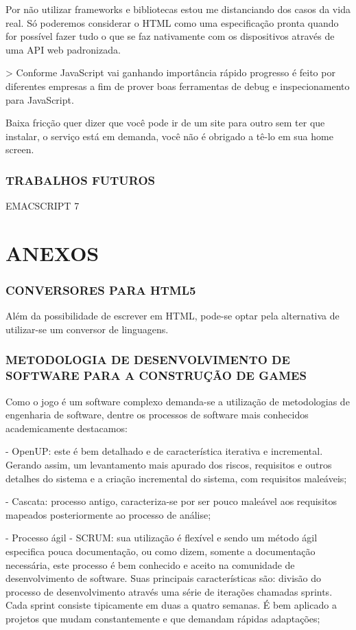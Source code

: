 \documentclass[11pt,a4paper]{article}
\begin{document}
Por não utilizar frameworks e bibliotecas estou me distanciando
dos casos da vida real. Só poderemos considerar o HTML como uma
especificação pronta quando
for possível fazer tudo o que se faz nativamente com os dispositivos
através de uma API web padronizada.

> Conforme JavaScript vai ganhando importância rápido progresso é
feito por diferentes empresas a fim de prover boas ferramentas de debug
e inspecionamento para JavaScript.

Baixa fricção quer dizer que você pode ir de um site para outro sem
ter que instalar, o serviço está em demanda, você não é obrigado a
tê-lo em sua home screen.


\subsection{ TRABALHOS FUTUROS}

EMACSCRIPT 7


\chapter{ANEXOS}

\subsection{ CONVERSORES PARA HTML5}
Além da possibilidade de escrever em HTML, pode-se optar pela
alternativa de utilizar-se um conversor de linguagens.

\subsection{ METODOLOGIA DE DESENVOLVIMENTO DE SOFTWARE PARA A CONSTRUÇÃO DE GAMES}

Como o jogo é um software complexo demanda-se a utilização de
metodologias de engenharia de software, dentre os processos de software
mais conhecidos academicamente destacamos:

- OpenUP: este é bem detalhado e de característica iterativa e
incremental. Gerando assim, um levantamento mais apurado dos riscos,
requisitos e outros detalhes do sistema e a criação incremental do
sistema, com requisitos maleáveis;

- Cascata: processo antigo, caracteriza-se por ser pouco maleável aos
requisitos mapeados posteriormente ao processo de análise;

- Processo ágil - SCRUM: sua utilização é flexível e sendo
um método ágil especifica pouca documentação, ou como dizem,
somente a documentação necessária, este processo é bem conhecido e
aceito na comunidade de desenvolvimento de software. Suas principais
características são: divisão do processo de desenvolvimento através
uma série de iterações chamadas sprints. Cada sprint consiste
tipicamente em duas a quatro semanas. É bem aplicado a projetos que
mudam constantemente e que demandam rápidas adaptações;
\end{document}
